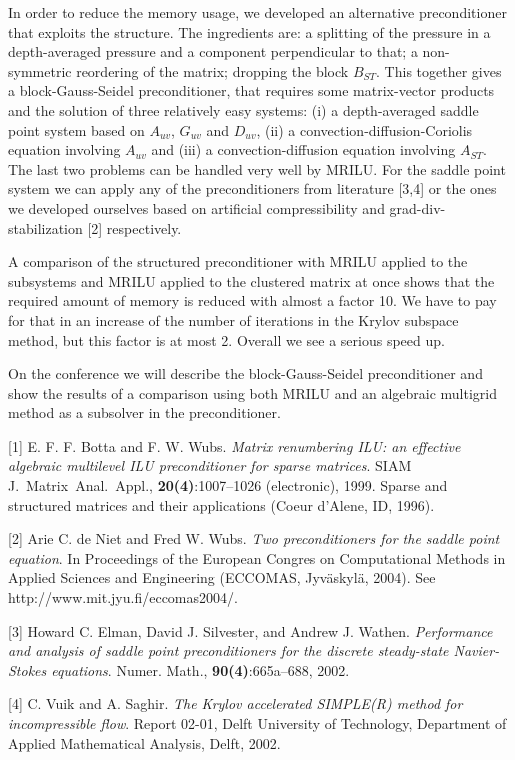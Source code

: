 \documentclass[twosided]{report}
\begin{document}
In order to reduce the memory usage, we developed an alternative
preconditioner that exploits the structure. The ingredients are: a
splitting of the pressure in a depth-averaged pressure and a component
perpendicular to that; a non-symmetric reordering of the matrix;
dropping the block $B_{ST}$. This together gives a block-Gauss-Seidel
preconditioner, that requires some matrix-vector products and the
solution of three relatively easy systems: (i) a depth-averaged saddle
point system based on $A_{uv}$, $G_{uv}$ and $D_{uv}$, (ii) a
convection-diffusion-Coriolis equation involving $A_{uv}$ and (iii) a
convection-diffusion equation involving $A_{ST}$. The last two problems can
be handled very well by MRILU. For the saddle point system we can apply
any of the preconditioners from literature [3,4] or the ones we
developed ourselves based on artificial compressibility and
grad-div-stabilization [2] respectively.

A comparison of the structured preconditioner with MRILU applied to the
subsystems and MRILU applied to the clustered matrix at once shows that
the required amount of memory is reduced with almost a factor 10. We
have to pay for that in an increase of the number of iterations in the
Krylov subspace method, but this factor is at most 2. Overall we see a
serious speed up.

On the conference we will describe the block-Gauss-Seidel
preconditioner and show the results of a comparison using both MRILU
and an algebraic multigrid method as a subsolver in the preconditioner.

[1]
E. F. F. Botta and F. W. Wubs.
{\em Matrix renumbering ILU: an effective algebraic multilevel ILU
preconditioner for sparse matrices}.
SIAM J.~Matrix~Anal.~Appl., {\bf 20(4)}:1007--1026 (electronic),
1999.
Sparse and structured matrices and their applications
(Coeur d'Alene, ID, 1996).

[2]
Arie C. de Niet and Fred W. Wubs.
{\em Two preconditioners for the saddle point
equation}.
In Proceedings of the European Congres on
Computational Methods in Applied Sciences
and Engineering (ECCOMAS,
Jyv\"{a}skyl\"{a}, 2004).
See http://www.mit.jyu.fi/eccomas2004/.

[3]
Howard C. Elman, David J.
Silvester, and Andrew J. Wathen.
{\em Performance and analysis of
saddle point preconditioners
for the discrete steady-state
Navier-Stokes equations}.
Numer. Math., {\bf 90(4)}:665a--688, 2002.

[4]
C. Vuik and A. Saghir.
{\em The Krylov accelerated SIMPLE(R) method for incompressible flow}.
Report 02-01, Delft University of Technology, Department of Applied
Mathematical Analysis, Delft, 2002.
\end{document}

